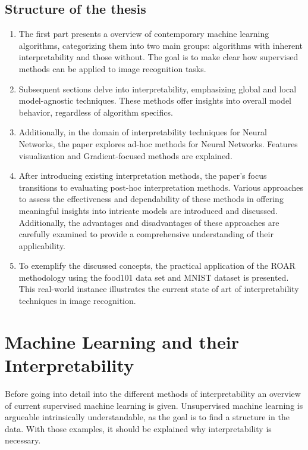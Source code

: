\newpage
\section{Structure of the thesis}

\begin{enumerate}
	\item The first part presents a overview of contemporary machine learning algorithms, categorizing them into two main groups: algorithms with inherent interpretability and those without. The goal is to make clear how supervised methods can be applied to image recognition tasks.
	\item Subsequent sections delve into interpretability, emphasizing global and local model-agnostic techniques. These methods offer insights into overall model behavior, regardless of algorithm specifics.   
	\item Additionally, in the domain of interpretability techniques for Neural Networks, the paper explores ad-hoc methods for Neural Networks. Features visualization and Gradient-focused methods are explained.
	\item After introducing existing interpretation methods, the paper's focus transitions to evaluating post-hoc interpretation methods. Various approaches to assess the effectiveness and dependability of these methods in offering meaningful insights into intricate models are introduced and discussed. Additionally, the advantages and disadvantages of these approaches are carefully examined to provide a comprehensive understanding of their applicability.
	\item To exemplify the discussed concepts, the practical application of the ROAR methodology using the food101 data set \cite{bossard14} and MNIST dataset \cite{deng2012mnist} is presented. This real-world instance illustrates the current state of art of interpretability techniques in image recognition.
\end{enumerate}



\chapter{Machine Learning and their Interpretability}


Before going into detail into the different methods of interpretability an overview of current supervised machine learning is given. Unsupervised machine learning is argueable intrinsically understandable, as the goal is to find a structure in the data. \cite{allen2023interpretable} With those examples, it should be explained why interpretability is necessary.

